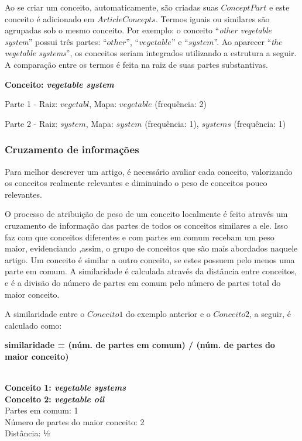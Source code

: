 Ao se criar um conceito, automaticamente, são criadas suas $ConceptPart$ e este conceito é adicionado em $ArticleConcepts$. Termos iguais ou similares são agrupadas sob o mesmo conceito. Por exemplo: o conceito “\emph{other vegetable system}” possui três partes: “$other$”, “$vegetable$” e “$system$”.  Ao aparecer “\emph{the vegetable systems}”, os conceitos seriam integrados utilizando a estrutura a seguir. A comparação entre os termos é feita na raiz de suas partes substantivas.

\textbf{Conceito: \emph{vegetable system}}

Parte 1 - Raiz: $vegetabl$, Mapa: $vegetable$ (frequência: 2)

Parte 2 - Raiz: $system$, Mapa: $system$ (frequência: 1), $systems$ (frequência: 1)

\subsubsection{Cruzamento de informações}
Para melhor descrever um artigo, é necessário avaliar cada conceito, valorizando os conceitos realmente relevantes e diminuindo o peso de conceitos pouco relevantes.

O processo de atribuição de peso de um conceito localmente é feito através um cruzamento de informação das partes de todos os conceitos similares a ele. Isso faz com que conceitos diferentes e com partes em comum recebam um peso maior, evidenciando ,assim, o grupo de conceitos que são mais abordados naquele artigo. Um conceito é similar a outro conceito, se estes possuem pelo menos uma parte em comum. A similaridade é calculada através da distância entre conceitos, e é a divisão do número de partes em comum pelo número de partes total do maior conceito.

A similaridade entre o $Conceito 1$ do exemplo anterior e o $Conceito 2$, a seguir, é calculado como: 

\begin{center}
\textbf{
similaridade = (núm. de partes em comum) / (núm. de partes do maior conceito)
}
\end{center}

\textbf{
\\ Conceito 1: \emph{vegetable systems}} \\
\textbf{
Conceito 2: \emph{vegetable oil}} \\
Partes em comum: 1 \\
Número de partes do maior conceito: 2 \\
Distância: ½ \\

